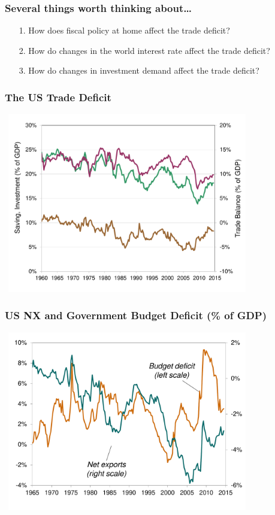 \documentclass[handout]{beamer}
\begin{document}
\begin{frame}[t]
\frametitle{Several things worth thinking about\ldots}
\begin{itemize}
\item[1.] How does fiscal policy at home affect the trade deficit?
\bigskip
\item[2.] How do changes in the world interest rate affect the trade deficit?
\bigskip
\item[3.] How do changes in investment demand affect the trade deficit?
\end{itemize}
\end{frame}


\begin{frame}[t]
\frametitle{The US Trade Deficit}
\begin{center}
\includegraphics[height=3.1in,width=4.25in]{us_trade_deficit.pdf}
\end{center}
\end{frame}


\begin{frame}[t]
\frametitle{US NX and Government Budget Deficit (\% of GDP)}
\begin{center}
\includegraphics[height=3.1in,width=4.25in]{us_nx_budget.pdf}
\end{center}
\end{frame}
\end{document}
